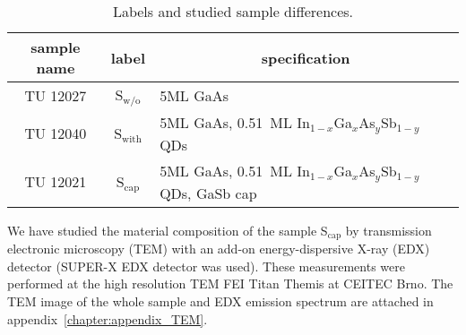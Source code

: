 \begin{table}
	\centering
	\caption{Labels and studied sample differences.}
	\begin{tabularx}{0.95\textwidth}{ccl}
		\toprule

		sample name & label& \multicolumn{1}{c}{specification}\\ 		
		\midrule
		\midrule
		TU 12027& S$_\mathrm{w/o}$ & 5ML GaAs\\
		TU 12040& S$_\mathrm{with}$ & 5ML GaAs, 0.51~ML In$_{1-x}$Ga$_{x}$As$_y$Sb$_{1-y}$ QDs\\
		TU 12021 & S$_\mathrm{cap}$ & 5ML GaAs, 0.51~ML In$_{1-x}$Ga$_{x}$As$_y$Sb$_{1-y}$ QDs, GaSb cap\\
		\bottomrule
	\end{tabularx}\label{tab:samples}
\end{table}


We have studied the material composition of the sample S$_\mathrm{cap}$ by transmission electronic microscopy (TEM) with an add-on energy-dispersive X-ray (EDX) detector (SUPER-X EDX detector was used). These measurements were performed at the high resolution TEM FEI Titan Themis at CEITEC Brno. The TEM image of the whole sample and EDX emission spectrum are attached in appendix~\ref{chapter:appendix_TEM}.

